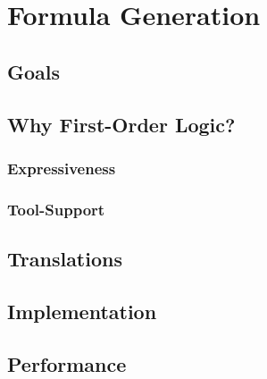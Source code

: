 \chapter{Formula Generation}
\section{Goals}
\section{Why First-Order Logic?}
\subsection{Expressiveness}
\subsection{Tool-Support}
\section{Translations}
\section{Implementation}
\section{Performance}
